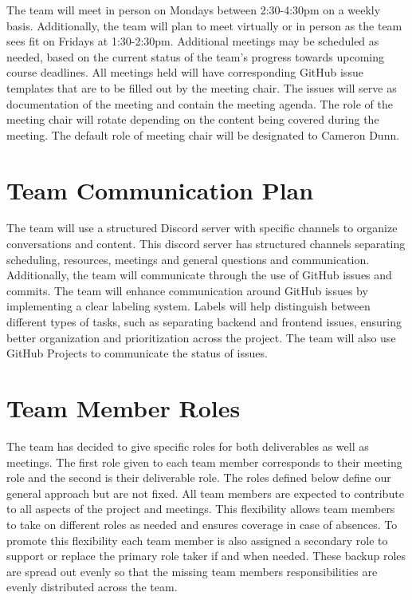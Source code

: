 \documentclass{article}
\begin{document}
The team will meet in person on Mondays between 2:30-4:30pm on a weekly basis. 
Additionally, the team will plan to meet virtually or in person as the team sees fit on Fridays at 1:30-2:30pm.
Additional meetings may be scheduled as needed, based on the current status of the team's progress towards upcoming course deadlines. 
All meetings held will have corresponding GitHub issue templates that are to be filled out by the meeting chair. The issues will serve as documentation of the meeting and contain the meeting agenda.
The role of the meeting chair will rotate depending on the content being covered during the meeting. 
The default role of meeting chair will be designated to Cameron Dunn. 

\section{Team Communication Plan}

The team will use a structured Discord server with specific channels to organize conversations and content. 
This discord server has structured channels separating scheduling, resources, meetings and general questions and communication. 
Additionally, the team will communicate through the use of GitHub issues and commits. 
The team will enhance communication around GitHub issues by implementing a clear labeling system. 
Labels will help distinguish between different types of tasks, such as separating backend and frontend issues, ensuring better organization and prioritization across the project. 
The team will also use GitHub Projects to communicate the status of issues. 

\section{Team Member Roles}

The team has decided to give specific roles for both deliverables as well as meetings. 
The first role given to each team member corresponds to their meeting role and the second is their deliverable role.
The roles defined below define our general approach but are not fixed.
All team members are expected to contribute to all aspects of the project and meetings.
This flexibility allows team members to take on different roles as needed and ensures coverage in case of absences.
To promote this flexibility each team member is also assigned a secondary role to support or replace the primary role taker if and when needed.
These backup roles are spread out evenly so that the missing team members responsibilities are evenly distributed across the team.
\end{document}
